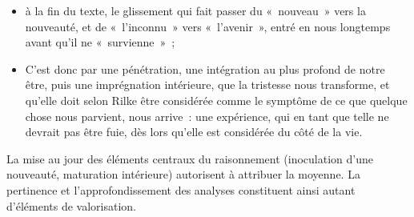 {\begin{itemize}
\item à la fin du texte, le glissement qui fait passer du «~nouveau~» vers la nouveauté,
et de «~l'inconnu~» vers «~l'avenir~», entré en nous longtemps avant qu'il ne
«~survienne~»~;
\item C'est donc par une pénétration, une intégration au plus profond de notre être,
puis une imprégnation intérieure, que la tristesse nous transforme, et qu'elle
doit selon Rilke être considérée comme le symptôme de ce que quelque chose
nous parvient, nous arrive~: une expérience, qui en tant que telle ne devrait pas
être fuie, dès lors qu'elle est considérée du côté de la vie.
\end{itemize}

La mise au jour des éléments centraux du raisonnement (inoculation d'une nouveauté,
maturation intérieure) autorisent à attribuer la moyenne. La pertinence et
l'approfondissement des analyses constituent ainsi autant d'éléments de valorisation.}%
